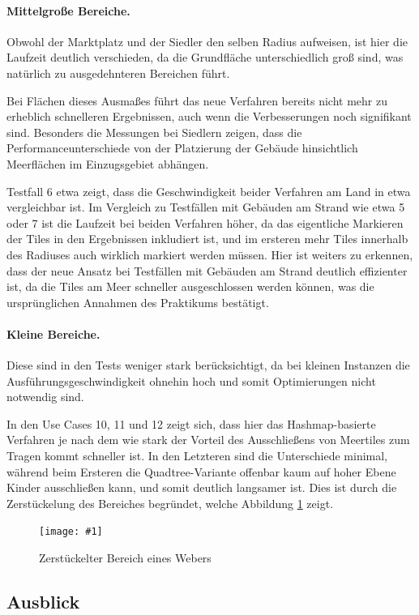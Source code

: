 \documentclass[%
			paper=a4,%
			DIV12,
			liststotoc,
			bibtotoc,
			draft=false,%
			titlepage,
			numbers=noendperiod
			]{scrartcl}
\newcommand{\myfig}[5] {
 \begin{figure}[tbph]
	 \centering
	 \texttt{[image: \#1]}
	 \caption[#4]{#5}
	 \label{fig:#2}
 \end{figure}
}
\begin{document}
\paragraph{Mittelgroße Bereiche.}
Obwohl der Marktplatz und der Siedler den selben Radius aufweisen, ist hier die Laufzeit deutlich verschieden, da die Grundfläche unterschiedlich groß sind, was natürlich zu ausgedehnteren Bereichen führt.

Bei Flächen dieses Ausmaßes führt das neue Verfahren bereits nicht mehr zu erheblich schnelleren Ergebnissen, auch wenn die Verbesserungen noch signifikant sind.
Besonders die Messungen bei Siedlern zeigen, dass die Performanceunterschiede von der Platzierung der Gebäude hinsichtlich Meerflächen im Einzugsgebiet abhängen.

Testfall 6 etwa zeigt, dass die Geschwindigkeit beider Verfahren am Land in etwa vergleichbar ist.
Im Vergleich zu Testfällen mit Gebäuden am Strand wie etwa 5 oder 7 ist die Laufzeit bei beiden Verfahren höher, da das eigentliche Markieren der Tiles in den Ergebnissen inkludiert ist, und im ersteren mehr Tiles innerhalb des Radiuses auch wirklich markiert werden müssen.
Hier ist weiters zu erkennen, dass der neue Ansatz bei Testfällen mit Gebäuden am Strand deutlich effizienter ist, da die Tiles am Meer schneller ausgeschlossen werden können, was die ursprünglichen Annahmen des Praktikums bestätigt.

\paragraph{Kleine Bereiche.}
Diese sind in den Tests weniger stark berücksichtigt, da bei kleinen Instanzen die Ausführungsgeschwindigkeit ohnehin hoch und somit Optimierungen nicht notwendig sind.

In den Use Cases 10, 11 und 12 zeigt sich, dass hier das Hashmap-basierte Verfahren je nach dem wie stark der Vorteil des Ausschließens von Meertiles zum Tragen kommt schneller ist.
In den Letzteren sind die Unterschiede minimal, während beim Ersteren die Quadtree-Variante offenbar kaum auf hoher Ebene Kinder ausschließen kann, und somit deutlich langsamer ist. 
Dies ist durch die Zerstückelung des Bereiches begründet, welche Abbildung \ref{fig:weaver} zeigt.

\myfig{img/weaver}{weaver}{width=.6\textwidth}{Zerstückelter Bereich eines Webers}{Zerstückelter Bereich eines Webers}


\subsection{Ausblick}
\end{document}

